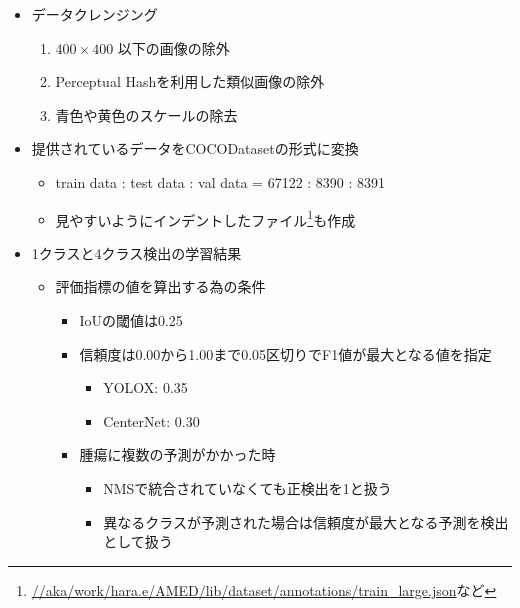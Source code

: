 \documentclass[a4j]{ujarticle}
\begin{document}
        \begin{itemize}
            \item データクレンジング
            \begin{enumerate}
                \item $400 \times 400$ 以下の画像の除外
                \item Perceptual Hashを利用した類似画像の除外
                \item 青色や黄色のスケールの除去
            \end{enumerate}

            \item 提供されているデータをCOCODatasetの形式に変換
            \begin{itemize}
                \item train data : test data : val data = 67122 : 8390 : 8391
                \item 見やすいようにインデントしたファイル\footnote{\url{//aka/work/hara.e/AMED/lib/dataset/annotations/train_large.json}など}も作成
            \end{itemize}

\clearpage

            \item 1クラスと4クラス検出の学習結果
            \begin{itemize}
                \item 評価指標の値を算出する為の条件
                \begin{itemize}
                    \item IoUの閾値は0.25
                    \item 信頼度は0.00から1.00まで0.05区切りでF1値が最大となる値を指定
                    \begin{itemize}
                        \item YOLOX: 0.35
                        \item CenterNet: 0.30
                    \end{itemize}
                    \item 腫瘍に複数の予測がかかった時
                    \begin{itemize}
                        \item NMSで統合されていなくても正検出を1と扱う
                        \item 異なるクラスが予測された場合は信頼度が最大となる予測を検出として扱う
                    \end{itemize}
                \end{itemize}
            \end{itemize}


\end{itemize}
\end{document}
